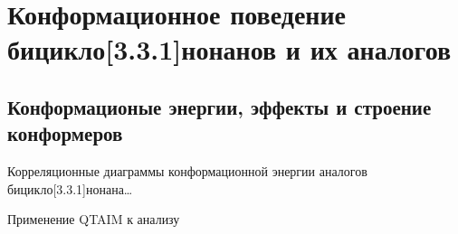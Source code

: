 \chapter{Конформационное поведение бицикло[3.3.1]нонанов и их аналогов}\label{ch:Conformation:331}

\section{Конформационые энергии, эффекты и строение конформеров}

Корреляционные диаграммы конформационной энергии аналогов бицикло[3.3.1]нонана\dots~\cite{Pisarev:2019}

Применение QTAIM к анализу~\cite{Bushmarinov:UX:2009,Bushmarinov:2011}

\newcommand{\ScaleCorrStr}{0.625}

